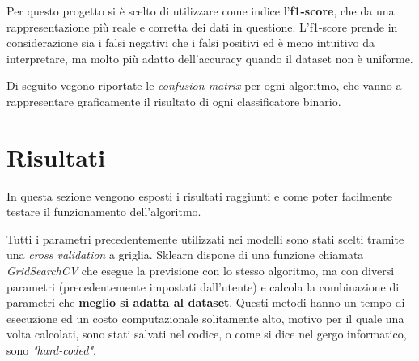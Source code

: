 \documentclass[12pt,a4paper]{article}
\begin{document}
Per questo progetto si è scelto di utilizzare come indice l'\textbf{f1-score}, che da una rappresentazione più reale e corretta dei dati in questione. L'f1-score prende in considerazione sia i falsi negativi che i falsi positivi ed è meno intuitivo da interpretare, ma molto più adatto dell'accuracy quando il dataset non è uniforme.

Di seguito vegono riportate le \textit{confusion matrix} per ogni algoritmo, che vanno a rappresentare graficamente il risultato di ogni classificatore binario.


\begin{figure}[H]
    \centering
    \caption{}
\end{figure}


\clearpage
\section{Risultati}
In questa sezione vengono esposti i risultati raggiunti e come poter facilmente testare il funzionamento dell'algoritmo.

Tutti i parametri precedentemente utilizzati nei modelli sono stati scelti tramite una \textit{cross validation} a griglia. Sklearn dispone di una funzione chiamata \textit{GridSearchCV} che esegue la previsione con lo stesso algoritmo, ma con diversi parametri (precedentemente impostati dall'utente) e calcola la combinazione di parametri che \textbf{meglio si adatta al dataset}. Questi metodi hanno un tempo di esecuzione ed un costo computazionale solitamente alto, motivo per il quale una volta calcolati, sono stati salvati nel codice, o come si dice nel gergo informatico, sono \textit{"hard-coded"}.
\end{document}
